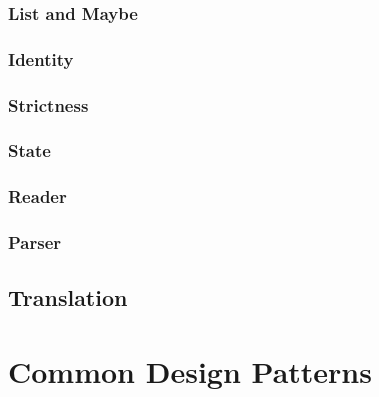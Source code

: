 \documentclass[acmsmall, nonacm, screen]{acmart}
\begin{document}
\subsubsection{List and Maybe}

\subsubsection{Identity}

\subsubsection{Strictness}

\subsubsection{State}

\subsubsection{Reader}

\subsubsection{Parser}

\subsection{Translation}

\section{Common Design Patterns} \label{sec:patterns}
\end{document}
